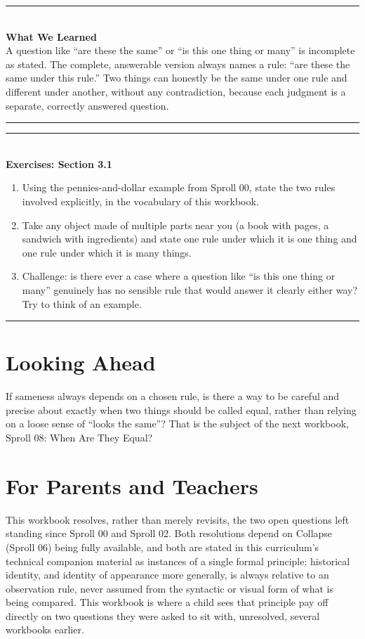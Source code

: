 \documentclass[11pt]{book}
\newenvironment{exercisebox}[1]{\vspace{0.8em}\noindent\rule{\linewidth}{0.6pt}\\[0.2em]\textbf{Exercises: #1}\\[0.3em]\begin{enumerate}[label=\arabic*., itemsep=0.4em]}{\end{enumerate}\noindent\rule{\linewidth}{0.6pt}\vspace{0.6em}}
\newenvironment{summarybox}{\vspace{0.6em}\noindent\rule{\linewidth}{0.6pt}\\[0.2em]\textbf{What We Learned}\\[0.3em]}{\\[0.2em]\noindent\rule{\linewidth}{0.6pt}\vspace{0.6em}}
\begin{document}
\begin{summarybox}
A question like ``are these the same'' or ``is this one thing or many'' is incomplete as stated. The complete, answerable version always names a rule: ``are these the same under this rule.'' Two things can honestly be the same under one rule and different under another, without any contradiction, because each judgment is a separate, correctly answered question.
\end{summarybox}

\begin{exercisebox}{Section 3.1}
\item Using the pennies-and-dollar example from Sproll 00, state the two rules involved explicitly, in the vocabulary of this workbook.
\item Take any object made of multiple parts near you (a book with pages, a sandwich with ingredients) and state one rule under which it is one thing and one rule under which it is many things.
\item Challenge: is there ever a case where a question like ``is this one thing or many'' genuinely has no sensible rule that would answer it clearly either way? Try to think of an example.
\end{exercisebox}

\chapter*{Looking Ahead}

If sameness always depends on a chosen rule, is there a way to be careful and precise about exactly when two things should be called equal, rather than relying on a loose sense of ``looks the same''? That is the subject of the next workbook, Sproll 08: When Are They Equal?

\chapter*{For Parents and Teachers}

This workbook resolves, rather than merely revisits, the two open questions left standing since Sproll 00 and Sproll 02. Both resolutions depend on Collapse (Sproll 06) being fully available, and both are stated in this curriculum's technical companion material as instances of a single formal principle: historical identity, and identity of appearance more generally, is always relative to an observation rule, never assumed from the syntactic or visual form of what is being compared. This workbook is where a child sees that principle pay off directly on two questions they were asked to sit with, unresolved, several workbooks earlier.
\end{document}
